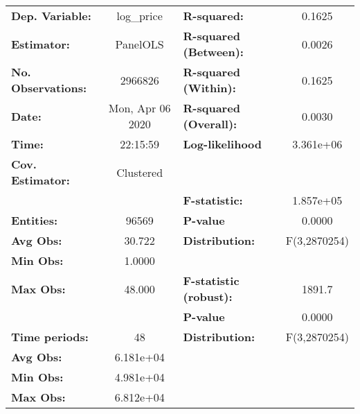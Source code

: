 \documentclass{report}
\begin{document}
\begin{center}
\begin{tabular}{lclc}
\toprule
\textbf{Dep. Variable:}      &     log\_price     & \textbf{  R-squared:         }   &      0.1625      \\
\textbf{Estimator:}          &      PanelOLS      & \textbf{  R-squared (Between):}  &      0.0026      \\
\textbf{No. Observations:}   &      2966826       & \textbf{  R-squared (Within):}   &      0.1625      \\
\textbf{Date:}               &  Mon, Apr 06 2020  & \textbf{  R-squared (Overall):}  &      0.0030      \\
\textbf{Time:}               &      22:15:59      & \textbf{  Log-likelihood     }   &    3.361e+06     \\
\textbf{Cov. Estimator:}     &     Clustered      & \textbf{                     }   &                  \\
\textbf{}                    &                    & \textbf{  F-statistic:       }   &    1.857e+05     \\
\textbf{Entities:}           &       96569        & \textbf{  P-value            }   &      0.0000      \\
\textbf{Avg Obs:}            &       30.722       & \textbf{  Distribution:      }   &   F(3,2870254)   \\
\textbf{Min Obs:}            &       1.0000       & \textbf{                     }   &                  \\
\textbf{Max Obs:}            &       48.000       & \textbf{  F-statistic (robust):} &      1891.7      \\
\textbf{}                    &                    & \textbf{  P-value            }   &      0.0000      \\
\textbf{Time periods:}       &         48         & \textbf{  Distribution:      }   &   F(3,2870254)   \\
\textbf{Avg Obs:}            &     6.181e+04      & \textbf{                     }   &                  \\
\textbf{Min Obs:}            &     4.981e+04      & \textbf{                     }   &                  \\
\textbf{Max Obs:}            &     6.812e+04      & \textbf{                     }   &                  \\
\bottomrule
\end{tabular}
\begin{tabular}{lcccccc}

\end{tabular}
\end{center}
\end{document}
